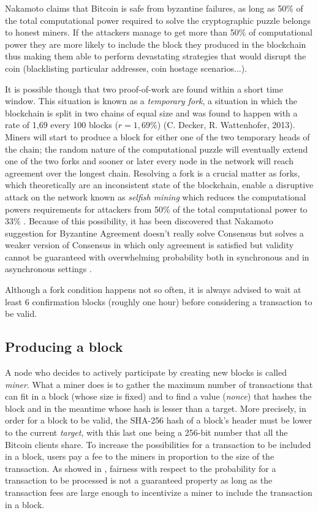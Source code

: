 		Nakamoto claims that Bitcoin is safe from byzantine failures, as long as 50\% of the total computational power required to solve the cryptographic puzzle belongs to honest miners. If the attackers manage to get more than 50\% of computational power they are more likely to include the block they produced in the blockchain thus making them able to perform devastating strategies that would disrupt the coin (blacklisting particular addresses, coin hostage scenarios...).
		
		It is possible though that two proof-of-work are found within a short time window. This situation is known as a \textit{temporary fork}, a situation in which the blockchain is split in two chains of equal size and was found to happen with a rate of 1,69 every 100 blocks (\(r = 1,69\%\)) (C. Decker, R. Wattenhofer, 2013). Miners will start to produce a block for either one of the two temporary heads of the chain; the random nature of the computational puzzle will eventually extend one of the two forks and sooner or later every node in the network will reach agreement over the longest chain. Resolving a fork is a crucial matter as forks, which theoretically are an inconsistent state of the blockchain, enable a disruptive attack on the network known as \textit{selfish mining} which reduces the computational powers requirements for attackers from 50\% of the total computational power to 33\% \cite{Eyal2013}. Because of this possibility, it has been discovered that Nakamoto suggestion for Byzantine Agreement doesn’t really solve Consensus but solves a weaker version of Consensus in which only agreement is satisfied but validity cannot be guaranteed with overwhelming probability both in synchronous \cite{Garay2015} and in asynchronous settings \cite{Pass2016}.
		
		Although a fork condition happens not so often, it is always advised to wait at least 6 confirmation blocks (roughly one hour) before considering a transaction to be valid.
		
		\subsection{Producing a block}
		
		A node who decides to actively participate by creating new blocks is called \textit{miner}. What a miner does is to gather the maximum number of transactions that can fit in a block (whose size is fixed) and to find a value (\textit{nonce}) that hashes the block and in the meantime whose hash is lesser than a target. More precisely, in order for a block to be valid, the SHA-256 hash of a block's header must be lower to the current \textit{target}, with this last one being a 256-bit number that all the Bitcoin clients share. To increase the possibilities for a transaction to be included in a block, users pay a fee to the miners in proportion to the size of the transaction. As showed in \cite{Gurcan2017}, fairness with respect to the probability for a transaction to be processed is not a guaranteed property as long as the transaction fees are large enough to incentivize a miner to include the transaction in a block.
		
